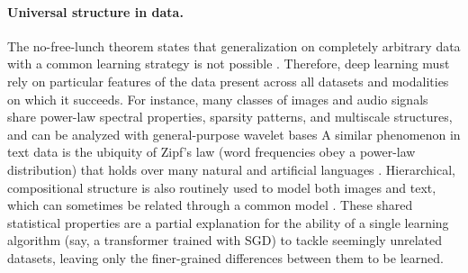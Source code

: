 \paragraph{Universal structure in data.}


The no-free-lunch theorem states that generalization on completely arbitrary data with a common learning strategy is not possible \citep{wolpert1996lack}.
Therefore, deep learning must rely on particular features of the data present across all datasets and modalities on which it succeeds.
For instance, many classes of images and audio signals share power-law spectral properties, sparsity patterns, and multiscale structures, and can be analyzed with general-purpose wavelet bases \citep{olshausen1996emergence,mallat1999wavelet}
A similar phenomenon in text data is the ubiquity of Zipf's law (word frequencies obey a power-law distribution) that holds over many natural and artificial languages \citep{li2002zipf,piantadosi2014zipf}. Hierarchical, compositional structure is also routinely used to model both images and text, which can sometimes be related through a common model \citep{cagnetta2024deep,sclocchi2025phase, cagnetta2025learning}. These shared statistical properties are a partial explanation for the ability of a single learning algorithm (say, a transformer trained with SGD) to tackle seemingly unrelated datasets, leaving only the finer-grained differences between them to be learned.




